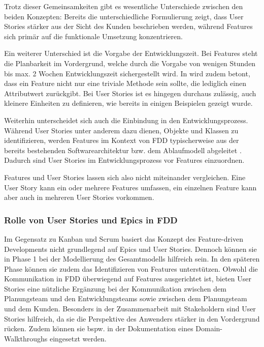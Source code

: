 \documentclass[acmtog]{acmart}
\begin{document}
Trotz dieser Gemeinsamkeiten gibt es wesentliche Unterschiede zwischen den beiden Konzepten:
Bereits die unterschiedliche Formulierung zeigt, dass User Stories stärker aus der Sicht des Kunden beschrieben werden, während Features sich primär auf die funktionale Umsetzung konzentrieren.

Ein weiterer Unterschied ist die Vorgabe der Entwicklungszeit.
Bei Features steht die Planbarkeit im Vordergrund, welche durch die Vorgabe von wenigen Stunden bis max. 2 Wochen Entwicklungszeit sichergestellt wird.
In \cite{palmer02} wird zudem betont, dass ein Feature nicht nur eine triviale Methode sein sollte, die lediglich einen Attributwert zurückgibt.
Bei User Stories ist es hingegen durchaus zulässig, auch kleinere Einheiten zu definieren, wie bereits in einigen Beispielen gezeigt wurde.

Weiterhin unterscheidet sich auch die Einbindung in den Entwicklungsprozess.
Während User Stories unter anderem dazu dienen, Objekte und Klassen zu identifizieren, werden Features im Kontext von FDD typischerweise aus der bereits bestehenden Softwarearchitektur bzw. dem Ablaufmodell abgeleitet \cite{palmer02}.
Dadurch sind User Stories im Entwicklungsprozess vor Features einzuordnen.

Features und User Stories lassen sich also nicht miteinander vergleichen. Eine User Story kann ein oder mehrere Features umfassen, ein einzelnen Feature kann aber auch in mehreren User Stories vorkommen\cite{coad99}.


\subsubsection{Rolle von User Stories und Epics in FDD}

Im Gegensatz zu Kanban und Scrum basiert das Konzept des Feature-driven Developments nicht grundlegend auf Epics und User Stories.
Dennoch können sie  in Phase 1 bei der Modellierung des Gesamtmodells hilfreich sein.
In den späteren Phase können sie zudem das Identifizieren von Features unterstützen.
Obwohl die Kommunikation in FDD überwiegend auf Features ausgerichtet ist, bieten User Stories eine nützliche Ergänzung bei der Kommunikation zwischen dem Planungsteam und den Entwicklungsteams sowie zwischen dem Planungsteam und dem Kunden.
Besonders in der Zusammenarbeit mit Stakeholdern sind User Stories hilfreich, da sie die Perspektive des Anwenders stärker in den Vordergrund rücken.
Zudem können sie bspw. in der Dokumentation eines Domain-Walkthroughs eingesetzt werden.
\end{document}
